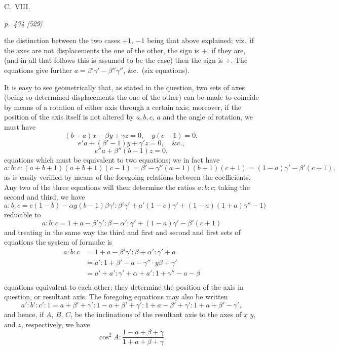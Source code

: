 \documentclass[11pt,a4paper]{article}
\theoremstyle{plain}
\theoremstyle{definition}
\begin{document}
\bigskip
\hfill{\small C.\ VIII.}

\clearpage

\bigskip
\textit{p.~434 [529]}
\smallskip

the distinction between the two cases $+ 1$, $- 1$ being that above explained; viz.\ if
the axes are not displacements the one of the other, the sign is $+$; if they are,
(and in all that follows this is assumed to be the case) then the sign is $+$. The
equations give further $a = \beta'\gamma' - \beta''\gamma''$, \&c.\ (six equations).

It is easy to see geometrically that, as stated in the question, two sets of axes
(being so determined displacements the one of the other) can be made to coincide by
means of a rotation of either axis through a certain axis; moreover, if the
position of the axis itself is not altered by $a, b, c$, $a$ and the angle of rotation, we
must have
\[
(b - a)x - \beta y + \gamma z = 0,\quad y(c - 1) = 0,
\]
\[
e'a + (\beta' - 1)y + \gamma' z = 0,\quad \&c.,
\]
\[
e''a + \beta''(b - 1)z = 0,
\]
equations which must be equivalent to two equations; we in fact have
\[
a:b:c:(a + b + 1)(a + b + 1)(c - 1) = \beta' - \gamma''(a - 1)(b + 1)(c + 1) = (1 - a)\gamma' - \beta'(c + 1),
\]
as is easily verified by means of the foregoing relations between the coefficients.
Any two of the three equations will then determine the ratios $a:b:c$; taking the
second and third, we have
\[
a:b:c = c(1 - b) - \alpha y(b - 1)\beta\gamma':\beta'\gamma' + a'(1 - c)\gamma' + (1 - a)(1 + a)\gamma'' - 1)
\]
reducible to
\[
a:b:c = 1 + a - \beta'\gamma':\beta - \alpha':\gamma' + (1 - a)\gamma' - \beta'(c + 1)
\]
and treating in the same way the third and first and second and first sets of equations
the system of formul\ae{} is
\begin{align*}
a:b:c &= 1 + a - \beta'\gamma':\beta + \alpha':\gamma' + a\\
&= a':1 + \beta' - a - \gamma'' \cdot y\beta + \gamma'\\
&= a' + a':\gamma' + \alpha + a':1 + \gamma'' - a - \beta\\
\end{align*}
equations equivalent to each other; they determine the position of the axis in question,
or resultant axis. The foregoing equations may also be written
\[
a':b':c':1 = a + \beta' + \gamma':1 - a + \beta' + \gamma':1 + a - \beta' + \gamma':1 + a + \beta' - \gamma',
\]
and hence, if $A$, $B$, $C$, be the inclinations of the resultant axis to the axes of $x$
$y$, and $z$, respectively, we have
\[
\cos^2 A : \frac{1 - a + \beta + \gamma}{1 + a + \beta + \gamma}.
\]
\end{document}
